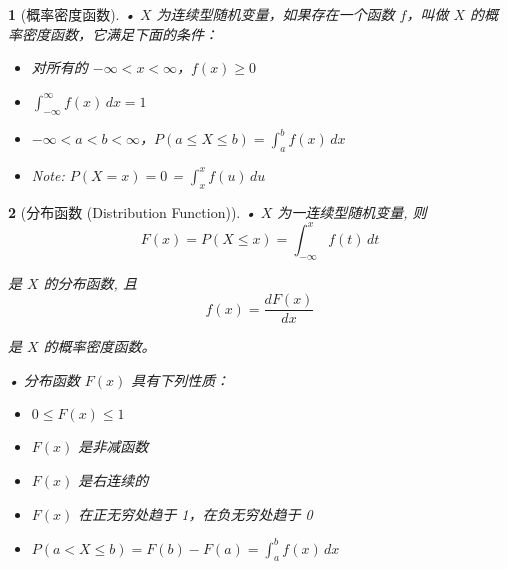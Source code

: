 \documentclass[UTF8]{report}
\theoremstyle{MyLineTheoremStyle} %
\theoremstyle{MyBlockTheoremStyle} %
\theoremstyle{MySubsubsectionStyle} %
\newtheorem{definition}{}
\begin{document}
\begin{definition}[概率密度函数]
    • \(X\) 为连续型随机变量，如果存在一个函数 \(f\)，叫做 \(X\) 的概率密度函数，它满足下面的条件：
    \begin{itemize}
        \item 对所有的 \(-\infty < x < \infty\)，\(f(x) \geq 0\)
        \item \(\int_{-\infty}^{\infty} f(x) \, dx = 1\)
        \item \(-\infty < a < b < \infty\)，\(P(a \leq X \leq b) = \int_{a}^{b} f(x) \, dx\)
        \item Note: \(P(X = x) = 0\) = \(\int_{x}^{x} f(u)\, du\)
    \end{itemize}
\end{definition}

\begin{definition}[分布函数 (Distribution Function)]
    • \(X\) 为一连续型随机变量, 则
    \[
    F(x) = P(X \leq x) = \int_{-\infty}^{x} f(t) \, dt
    \]\par
    是 \(X\) 的分布函数, 且
    \[
    f(x) = \frac{dF(x)}{dx}
    \]\par
    是 \(X\) 的概率密度函数。\par
    • 分布函数 \(F(x)\) 具有下列性质：
    \begin{itemize}
        \item \(0 \leq F(x) \leq 1\)
        \item \(F(x)\) 是非减函数
        \item \(F(x)\) 是右连续的
        \item \(F(x)\) 在正无穷处趋于 1，在负无穷处趋于 0
        \item \(P(a < X \leq b) = F(b) - F(a) = \int_{a}^{b} f(x) \, dx\)
    \end{itemize}
\end{definition}
\end{document}
